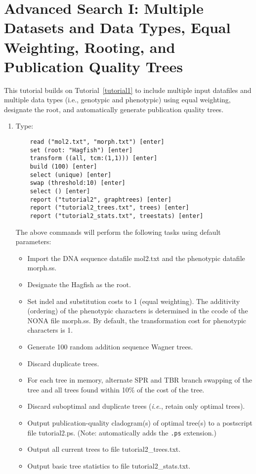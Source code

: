 \section[Advanced Search]{Advanced Search I: Multiple Datasets and Data Types, Equal 
Weighting, Rooting, and Publication Quality Trees}{\label{tutorial2}}

This tutorial builds on Tutorial~\ref{tutorial1} to include multiple input datafiles and 
multiple data types (i.e., genotypic and phenotypic) using equal weighting, 
designate the root, and automatically generate publication quality trees.

\begin{enumerate}
\item Type: 

\begin{verbatim}
    read ("mol2.txt", "morph.txt") [enter]
    set (root: "Hagfish") [enter]
    transform ((all, tcm:(1,1))) [enter]
    build (100) [enter]
    select (unique) [enter]
    swap (threshold:10) [enter]
    select () [enter]
    report ("tutorial2", graphtrees) [enter]
    report ("tutorial2_trees.txt", trees) [enter]
    report ("tutorial2_stats.txt", treestats) [enter]
\end{verbatim}

The above commands will perform the following tasks using default parameters:

\begin{itemize}
\item Import the DNA sequence datafile mol2.txt and the phenotypic datafile 
morph.ss. 
\item Designate the Hagfish as the root. 
\item Set indel and substitution costs to 1 (equal weighting). The additivity 
(ordering) of the phenotypic characters is determined in the ccode of the 
NONA file morph.ss. By default, the transformation cost for phenotypic 
characters is 1.  
\item Generate 100 random addition sequence Wagner trees.
\item Discard duplicate trees.
\item For each tree in memory, alternate SPR and TBR branch swapping of the tree 
and all trees found within 10\% of the cost of the tree.
\item Discard suboptimal and duplicate trees (\emph{i.e.}, retain only optimal trees).
\item Output publication-quality cladogram(s) of optimal tree(s) to a postscript 
file tutorial2.ps. (Note: \poy automatically adds the \texttt{.ps} extension.)  
\item Output all current trees to file tutorial2\_trees.txt.
\item Output basic tree statistics to file tutorial2\_stats.txt.
\end{itemize}


\end{enumerate}
